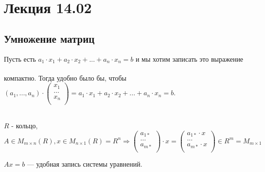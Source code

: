 \section{Лекция 14.02}

\subsection{Умножение матриц}
\quad
\begin{remark}
    Пусть есть $a_1 \cdot x_1 + a_2 \cdot x_2 + ... + a_n \cdot x_n = b$ и мы хотим записать это выражение \\ \\ компактно.
    Тогда удобно было бы, чтобы $(a_1, ..., a_n) \cdot 
    \begin{pmatrix}
        x_1\\
        \dots\\
        x_n\\
    \end{pmatrix} = a_1 \cdot x_1 + a_2 \cdot x_2 + ... + a_n \cdot x_n = b$.\\
\end{remark}

\begin{definition}
    \\
    $R$ - кольцо, $A \in M_{m \times n}(R), x \in M_{n \times 1}(R) = R^n \Longrightarrow
    \begin{pmatrix}
        a_{1*}\\
        \dots\\
        a_{m*}\\
    \end{pmatrix} \cdot x =   \begin{pmatrix}
        a_{1*} \cdot x\\
        \dots\\
        a_{m*} \cdot x\\
    \end{pmatrix} \in R ^ m = M_{m \times 1}$ 
\end{definition}

\quad
\begin{remark}
    $Ax = b$ --- удобная запись системы уравнений.
\end{remark}

